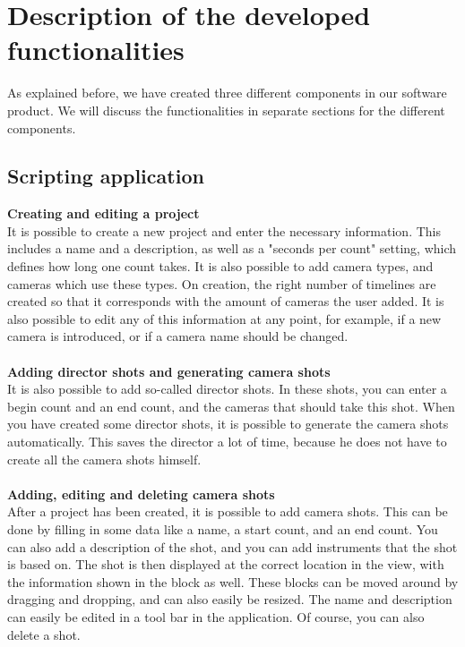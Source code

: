 \section{Description of the developed functionalities}

As explained before, we have created three different components in our software product. We will discuss the functionalities in separate sections for the different components.

\subsection{Scripting application}
\textbf{Creating and editing a project}\\
It is possible to create a new project and enter the necessary information. This includes a name and a description, as well as a "seconds per count" setting, which defines how long one count takes. It is also possible to add camera types, and cameras which use these types. On creation, the right number of timelines are created so that it corresponds with the amount of cameras the user added. It is also possible to edit any of this information at any point, for example, if a new camera is introduced, or if a camera name should be changed.\\\\
\textbf{Adding director shots and generating camera shots}\\
It is also possible to add so-called director shots. In these shots, you can enter a begin count and an end count, and the cameras that should take this shot. When you have created some director shots, it is possible to generate the camera shots automatically. This saves the director a lot of time, because he does not have to create all the camera shots himself.\\\\
\textbf{Adding, editing and deleting camera shots}\\
After a project has been created, it is possible to add camera shots. This can be done by filling in some data like a name, a start count, and an end count. You can also add a description of the shot, and you can add instruments that the shot is based on. The shot is then displayed at the correct location in the view, with the information shown in the block as well. These blocks can be moved around by dragging and dropping, and can also easily be resized. The name and description can easily be edited in a tool bar in the application. Of course, you can also delete a shot.\\\\
